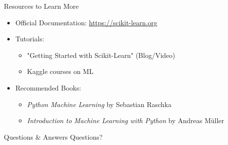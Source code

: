 	\begin{frame}{Resources to Learn More}
		\begin{itemize}
			\item Official Documentation: \url{https://scikit-learn.org}
			\item Tutorials:
			\begin{itemize}
				\item "Getting Started with Scikit-Learn" (Blog/Video)
				\item Kaggle courses on ML
			\end{itemize}
			\item Recommended Books:
			\begin{itemize}
				\item \textit{Python Machine Learning} by Sebastian Raschka
				\item \textit{Introduction to Machine Learning with Python} by Andreas Müller
			\end{itemize}
		\end{itemize}
	\end{frame}
	
	\begin{frame}{Questions \& Answers}
		\centering
		\Large Questions?
	\end{frame}
	


